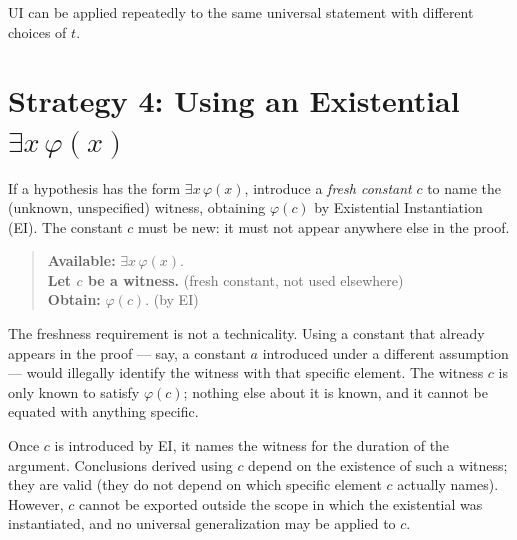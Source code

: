 \begin{exposition}
UI can be applied repeatedly to the same universal statement with different
choices of $t$.
\end{exposition}


\section*{\texorpdfstring{Strategy 4: Using an Existential $\exists x\,\varphi(x)$}{Strategy 4: Using an Existential exists x phi(x)}}

\begin{exposition}
If a hypothesis has the form $\exists x\,\varphi(x)$, introduce a \emph{fresh
constant} $c$ to name the (unknown, unspecified) witness, obtaining $\varphi(c)$
by Existential Instantiation (EI). The constant $c$ must be new: it must not
appear anywhere else in the proof.
\end{exposition}

\begin{quote}
\textbf{Available:} $\exists x\,\varphi(x)$.\\
\textbf{Let $c$ be a witness.} (fresh constant, not used elsewhere)\\
\textbf{Obtain:} $\varphi(c)$. \quad (by EI)
\end{quote}

\begin{exposition}
The freshness requirement is not a technicality. Using a constant that already
appears in the proof --- say, a constant $a$ introduced under a different
assumption --- would illegally identify the witness with that specific element.
The witness $c$ is only known to satisfy $\varphi(c)$; nothing else about it
is known, and it cannot be equated with anything specific.
\end{exposition}

\begin{remark*}
Once $c$ is introduced by EI, it names the witness for the duration of the
argument. Conclusions derived using $c$ depend on the existence of such a
witness; they are valid (they do not depend on which specific element $c$
actually names). However, $c$ cannot be exported outside the scope in which
the existential was instantiated, and no universal generalization may be
applied to $c$.
\end{remark*}

